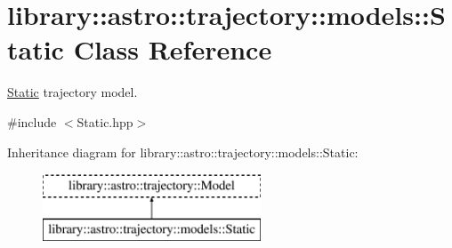 \hypertarget{classlibrary_1_1astro_1_1trajectory_1_1models_1_1_static}{}\section{library\+:\+:astro\+:\+:trajectory\+:\+:models\+:\+:Static Class Reference}
\label{classlibrary_1_1astro_1_1trajectory_1_1models_1_1_static}


\hyperlink{classlibrary_1_1astro_1_1trajectory_1_1models_1_1_static}{Static} trajectory model.  




{\ttfamily \#include $<$Static.\+hpp$>$}

Inheritance diagram for library\+:\+:astro\+:\+:trajectory\+:\+:models\+:\+:Static\+:\begin{figure}[H]
\begin{center}
\leavevmode
\includegraphics[height=2.000000cm]{classlibrary_1_1astro_1_1trajectory_1_1models_1_1_static}
\end{center}
\end{figure}
